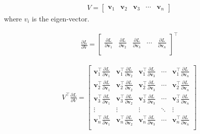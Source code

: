 \documentclass{article}
\newcommand{\bv}{\mathbf{v}}
\begin{document}
	\begin{equation}
	\begin{aligned}
	V = 
	\begin{bmatrix}
	\bv_{1} &\bv_{2} &\bv_{3} &\cdots &\bv_{n}
	\end{bmatrix}
	\end{aligned}
	\end{equation}
	where $v_{i}$ is the eigen-vector.
	
	\begin{equation}
	\begin{aligned}
	\frac{\partial L}{\partial V} = 
	\begin{bmatrix}
	\frac{\partial L}{\partial \bv_{1}} &\frac{\partial L}{\partial \bv_{2}}  &\frac{\partial L}{\partial \bv_{3}}  &\cdots &\frac{\partial L}{\partial \bv_{n}} \\
	\end{bmatrix}^{\top}
	\end{aligned}
	\end{equation}
	
	\begin{equation}
	\begin{aligned}
	V^{\top}\frac{\partial L}{\partial V} = 
	\begin{bmatrix}
	\bv_{1}^{\top}\frac{\partial L}{\partial \bv_{1}} &\bv_{1}^{\top}\frac{\partial L}{\partial \bv_{2}}  &\bv_{1}^{\top}\frac{\partial L}{\partial \bv_{3}}  &\cdots &\bv_{1}^{\top}\frac{\partial L}{\partial \bv_{n}} \\
	\bv_{2}^{\top}\frac{\partial L}{\partial \bv_{1}} &\bv_{2}^{\top}\frac{\partial L}{\partial \bv_{2}}  &\bv_{2}^{\top}\frac{\partial L}{\partial \bv_{3}}  &\cdots &\bv_{2}^{\top}\frac{\partial L}{\partial \bv_{n}} \\
	\bv_{3}^{\top}\frac{\partial L}{\partial \bv_{1}} &\bv_{3}^{\top}\frac{\partial L}{\partial \bv_{2}}  &\bv_{3}^{\top}\frac{\partial L}{\partial \bv_{3}}  &\cdots &\bv_{3}^{\top}\frac{\partial L}{\partial \bv_{n}} \\
	\vdots &\vdots &\vdots &\ddots &\vdots\\
	\bv_{n}^{\top}\frac{\partial L}{\partial \bv_{1}} &\bv_{n}^{\top}\frac{\partial L}{\partial \bv_{2}}  &\bv_{n}^{\top}\frac{\partial L}{\partial \bv_{3}}  &\cdots &\bv_{n}^{\top}\frac{\partial L}{\partial \bv_{n}} \\
	\end{bmatrix}
	\end{aligned}
	\end{equation}
	
\end{document}
